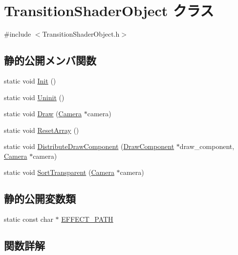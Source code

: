 \hypertarget{class_transition_shader_object}{}\section{Transition\+Shader\+Object クラス}
\label{class_transition_shader_object}


{\ttfamily \#include $<$Transition\+Shader\+Object.\+h$>$}

\subsection*{静的公開メンバ関数}
\begin{DoxyCompactItemize}
\item 
static void \mbox{\hyperlink{class_transition_shader_object_a97878416bcc6fcc45b762efc1a5b0f14}{Init}} ()
\item 
static void \mbox{\hyperlink{class_transition_shader_object_a6329fe661ab5ca4ba3e23072d401a319}{Uninit}} ()
\item 
static void \mbox{\hyperlink{class_transition_shader_object_a874f52921658716416f604e1ae89593f}{Draw}} (\mbox{\hyperlink{class_camera}{Camera}} $\ast$camera)
\item 
static void \mbox{\hyperlink{class_transition_shader_object_a2897993e61767a328aa409a8e54e0591}{Reset\+Array}} ()
\item 
static void \mbox{\hyperlink{class_transition_shader_object_a5903697cb1bc8c14388049ad8cd3f0b3}{Distribute\+Draw\+Component}} (\mbox{\hyperlink{class_draw_component}{Draw\+Component}} $\ast$draw\+\_\+component, \mbox{\hyperlink{class_camera}{Camera}} $\ast$camera)
\item 
static void \mbox{\hyperlink{class_transition_shader_object_a1ffa195068b30e6a5c21e3cb50d7fc1f}{Sort\+Transparent}} (\mbox{\hyperlink{class_camera}{Camera}} $\ast$camera)
\end{DoxyCompactItemize}
\subsection*{静的公開変数類}
\begin{DoxyCompactItemize}
\item 
static const char $\ast$ \mbox{\hyperlink{class_transition_shader_object_a1ef65490b6ef22b643ed47c74caf695e}{E\+F\+F\+E\+C\+T\+\_\+\+P\+A\+TH}}
\end{DoxyCompactItemize}


\subsection{関数詳解}
\mbox{\label{class_transition_shader_object_a5903697cb1bc8c14388049ad8cd3f0b3}} 
